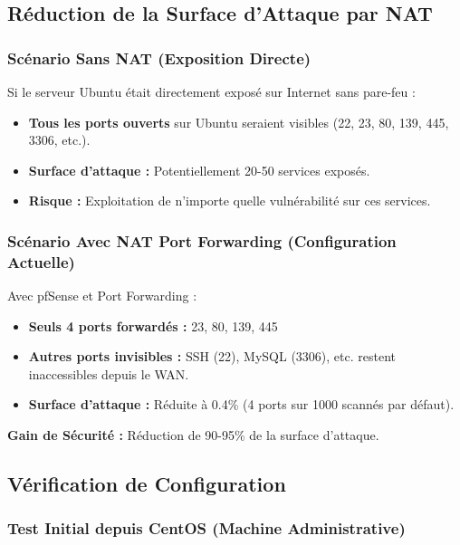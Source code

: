\documentclass[12pt,a4paper,openany]{report}
\begin{document}
	\subsection{Réduction de la Surface d'Attaque par NAT}
	
	\subsubsection{Scénario Sans NAT (Exposition Directe)}
	Si le serveur Ubuntu était directement exposé sur Internet sans pare-feu :
	
	\begin{itemize}
		\item \textbf{Tous les ports ouverts} sur Ubuntu seraient visibles (22, 23, 80, 139, 445, 3306, etc.).
		\item \textbf{Surface d'attaque :} Potentiellement 20-50 services exposés.
		\item \textbf{Risque :} Exploitation de n'importe quelle vulnérabilité sur ces services.
	\end{itemize}
	
	\subsubsection{Scénario Avec NAT Port Forwarding (Configuration Actuelle)}
	Avec pfSense et Port Forwarding :
	
	\begin{itemize}
		\item \textbf{Seuls 4 ports forwardés :} 23, 80, 139, 445
		\item \textbf{Autres ports invisibles :} SSH (22), MySQL (3306), etc. restent inaccessibles depuis le WAN.
		\item \textbf{Surface d'attaque :} Réduite à 0.4\% (4 ports sur 1000 scannés par défaut).
	\end{itemize}
	
	\textbf{Gain de Sécurité :} Réduction de 90-95\% de la surface d'attaque.
	
	\subsection{Vérification de Configuration}
	
	\subsubsection{Test Initial depuis CentOS (Machine Administrative)}
	
\end{document}

